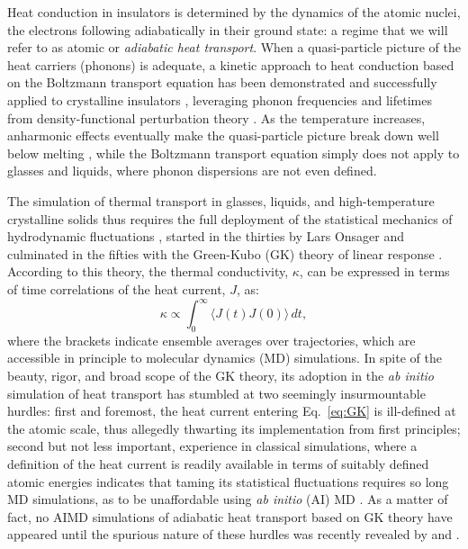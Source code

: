 Heat conduction in insulators is determined by the dynamics of the atomic nuclei, the electrons following adiabatically in their ground state: a regime that we will refer to as atomic or \emph{adiabatic heat transport}. When a quasi-particle picture of the heat carriers (phonons) is adequate, a kinetic approach to heat conduction based on the Boltzmann transport equation \citep{Peierls1929} has been demonstrated \citep{Broido:2007iu} and successfully applied to crystalline insulators \citep{Zhou2016}, leveraging phonon frequencies and lifetimes from density-functional perturbation theory \citep{Baroni1987a,Giannozzi1991,Debernardi1995,Baroni2001}. As the temperature increases, anharmonic effects eventually make the quasi-particle picture break down well below melting \citep{Turney:2009bb}, while the Boltzmann transport equation simply does not apply to glasses and liquids, where phonon dispersions are not even defined.

The simulation of thermal transport in glasses, liquids, and high-tem\-per\-a\-ture crystalline solids thus requires the full deployment of the statistical mechanics of hydrodynamic fluctuations \citep{Kadanoff1963}, started in the thirties by Lars Onsager \citep{Onsager1931a,Onsager1931b} and culminated in the fifties with the Green-Kubo (GK) theory of linear response \citep{Green1952,Green1954,Kubo1957a,Kubo1957b}. According to this theory, the thermal conductivity, $\kappa$, can be expressed in terms of time correlations of the heat current, $J$, as:
\begin{equation}
\kappa\propto\int_{0}^{\infty}\!\langle{J}(t){J}(0)\rangle\, dt,\label{eq:GK}
\end{equation}
where the brackets indicate ensemble averages over trajectories, which are accessible in principle to molecular dynamics (MD) simulations. In spite of the beauty, rigor, and broad scope of the GK theory, its adoption in the \emph{ab initio} simulation of heat transport has stumbled at two seemingly insurmountable hurdles: first and foremost, the heat current entering Eq.~\eqref{eq:GK} is ill-defined at the atomic scale, thus allegedly thwarting its implementation from first principles; second but not less important, experience in classical simulations, where a definition of the heat current is readily available in terms of suitably defined atomic energies \citep{Irving1950} indicates that taming its statistical fluctuations requires so long MD simulations, as to be unaffordable using \emph{ab initio} (AI) MD \citep{Car1985,Marx2009}. As a matter of fact, no AIMD simulations of adiabatic heat transport based on GK theory have appeared until the spurious nature of these hurdles was recently revealed by \cite{Marcolongo2016} and \cite{Ercole2016,Ercole2017}.

